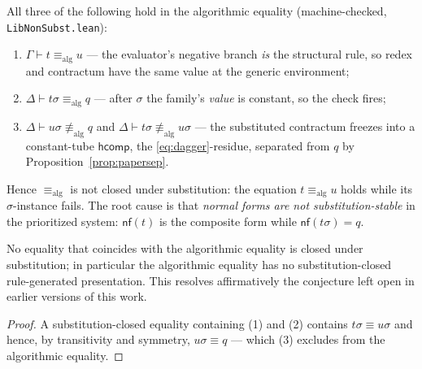 \documentclass{lmcs}
\newcommand{\hcomp}{\mathsf{hcomp}}
\newcommand{\nf}{\mathsf{nf}}
\renewcommand{\conv}{\equiv}
\newcommand{\aconv}{\equiv_{\mathrm{alg}}}
\begin{document}
\begin{thm}\label{thm:nonsubst}
  All three of the following hold in the algorithmic equality
  (machine-checked, \texttt{LibNonSubst.lean}):
  \begin{enumerate}
  \item $\Gamma \vdash t \aconv u$ --- the evaluator's negative
    branch \emph{is} the structural rule, so redex and contractum
    have the same value at the generic environment;
  \item $\Delta \vdash t\sigma \aconv q$ --- after $\sigma$ the
    family's \emph{value} is constant, so the check fires;
  \item $\Delta \vdash u\sigma \not\aconv q$ and
    $\Delta \vdash t\sigma \not\aconv u\sigma$ --- the substituted
    contractum freezes into a constant-tube $\hcomp$, the
    \eqref{eq:dagger}-residue, separated from $q$ by
    Proposition~\ref{prop:papersep}.
  \end{enumerate}
  Hence $\aconv$ is not closed under substitution: the equation
  $t \aconv u$ holds while its $\sigma$-instance fails.  The root
  cause is that \emph{normal forms are not substitution-stable} in
  the prioritized system: $\nf(t)$ is the composite form while
  $\nf(t\sigma) = q$.
\end{thm}

\begin{cor}[No presentation]\label{cor:nopresentation}
  No equality that coincides with the algorithmic equality is closed
  under substitution; in particular the algorithmic equality has no
  substitution-closed rule-generated presentation.  This resolves
  affirmatively the conjecture left open in earlier versions of this
  work.
\end{cor}
\begin{proof}
  A substitution-closed equality containing (1) and (2) contains
  $t\sigma \conv u\sigma$ and hence, by transitivity and symmetry,
  $u\sigma \conv q$ --- which (3) excludes from the algorithmic
  equality.
\end{proof}
\end{document}

